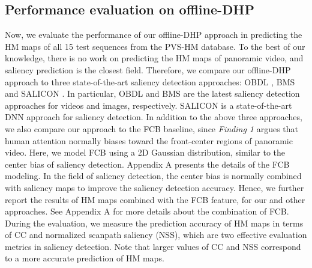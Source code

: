 \documentclass[10pt,journal,compsoc]{IEEEtran}
\begin{document}
\subsection{Performance evaluation on offline-DHP}\label{sec:evaluation_offline}
\label{compare}




Now, we evaluate the performance of our offline-DHP approach in predicting the HM maps of all 15 test sequences from the PVS-HM database. To the best of our knowledge, there is no work on predicting the HM maps of panoramic video, and saliency prediction is the closest field. Therefore, we compare our offline-DHP approach to three state-of-the-art saliency detection approaches: OBDL  \cite{hossein2015many}, BMS \cite{zhang2016exploiting} and SALICON \cite{huang2015salicon}.
In particular, OBDL  \cite{hossein2015many} and BMS \cite{zhang2016exploiting} are the latest saliency detection approaches for videos and images, respectively.
SALICON\cite{huang2015salicon} is a state-of-the-art DNN approach for saliency detection.
In addition to the above three approaches, we also compare our approach to the FCB baseline, since \textit{Finding 1} argues that human attention normally biases toward the front-center regions of panoramic video.
Here, we model FCB using a 2D Gaussian distribution, similar to the center bias of saliency detection.
Appendix A presents the details of the FCB modeling.
In the field of saliency detection, the center bias  \cite{borji2013state} is normally combined with saliency maps to improve the saliency detection accuracy. Hence, we further report the results of HM maps combined with the FCB feature, for our and other approaches.
See Appendix A for more details about the combination of FCB.
During the evaluation, we measure the prediction accuracy of HM maps in terms of CC and normalized scanpath saliency (NSS), which are two effective evaluation metrics \textcolor{blue}{\cite{Li_2015_ICCV}} in saliency detection.
Note that larger values of CC and NSS correspond to a more accurate prediction of HM maps.
\end{document}
